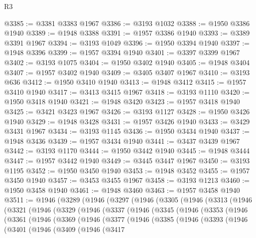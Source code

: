 \begin{lexlean}{R3}
\begin{coremodule}
@3385 := @3381 @3383 @1967
@3386 := @3193 @1032
@3388 := @1950 @3386 @1940
@3389 := @1948 @3388
@3391 := @1957 @3386 @1940
@3393 := @3389 @3391 @1967
@3394 := @3193 @1049
@3396 := @1950 @3394 @1940
@3397 := @1948 @3396
@3399 := @1957 @3394 @1940
@3401 := @3397 @3399 @1967
@3402 := @3193 @1075
@3404 := @1950 @3402 @1940
@3405 := @1948 @3404
@3407 := @1957 @3402 @1940
@3409 := @3405 @3407 @1967
@3410 := @3193 @636
@3412 := @1950 @3410 @1940
@3413 := @1948 @3412
@3415 := @1957 @3410 @1940
@3417 := @3413 @3415 @1967
@3418 := @3193 @1110
@3420 := @1950 @3418 @1940
@3421 := @1948 @3420
@3423 := @1957 @3418 @1940
@3425 := @3421 @3423 @1967
@3426 := @3193 @1127
@3428 := @1950 @3426 @1940
@3429 := @1948 @3428
@3431 := @1957 @3426 @1940
@3433 := @3429 @3431 @1967
@3434 := @3193 @1145
@3436 := @1950 @3434 @1940
@3437 := @1948 @3436
@3439 := @1957 @3434 @1940
@3441 := @3437 @3439 @1967
@3442 := @3193 @1170
@3444 := @1950 @3442 @1940
@3445 := @1948 @3444
@3447 := @1957 @3442 @1940
@3449 := @3445 @3447 @1967
@3450 := @3193 @1195
@3452 := @1950 @3450 @1940
@3453 := @1948 @3452
@3455 := @1957 @3450 @1940
@3457 := @3453 @3455 @1967
@3458 := @3193 @1213
@3460 := @1950 @3458 @1940
@3461 := @1948 @3460
@3463 := @1957 @3458 @1940
@3511 := @1946
    (@3289
      (@1946
        (@3297
          (@1946
            (@3305
              (@1946
                (@3313
                  (@1946
                    (@3321
                      (@1946
                        (@3329
                          (@1946
                            (@3337
                              (@1946
                                (@3345
                                  (@1946
                                    (@3353
                                      (@1946
                                        (@3361
                                          (@1946
                                            (@3369
                                              (@1946
                                                (@3377
                                                  (@1946
                                                    (@3385
                                                      (@1946
                                                        (@3393
                                                          (@1946
                                                            (@3401
                                                              (@1946
                                                                (@3409
                                                                  (@1946
                                                                    (@3417

\end{coremodule}
\end{lexlean}
